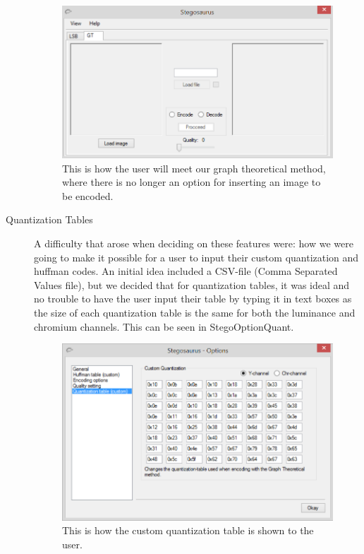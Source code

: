 \begin{description}
\begin{figure}
	\centering
	\includegraphics[width=1\textwidth]{figures/StegoGTAMain.png}
	\caption{This is how the user will meet our graph theoretical method, where there is no longer an option for inserting an image to be encoded.}
	\label{fig:StegoGTAMain}
\end{figure}

\item[Quantization Tables]
A difficulty that arose when deciding on these features were: how we were going to make it possible for a user to input their custom quantization and huffman codes.
An initial idea included a CSV-file (Comma Separated Values file), but we decided that for quantization tables, it was ideal and no trouble to have the user input their table by typing it in text boxes as the size of each quantization table is the same for both the luminance and chromium channels. This can be seen in \figurename{StegoOptionQuant}.
\begin{figure}
	\centering
	\includegraphics[width=1\textwidth]{figures/StegoOptionQuant.png}
	\caption{This is how the custom quantization table is shown to the user.}
	\label{fig:StegoOptionQuant}
\end{figure}


\end{description}
